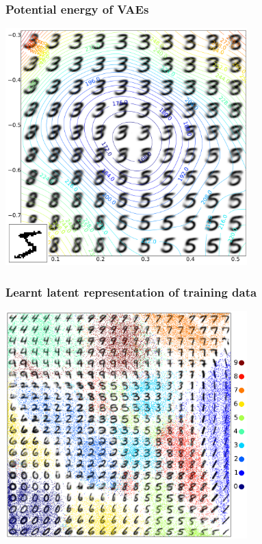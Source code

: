 \documentclass{beamer}
\begin{document}
\begin{frame}[noframenumbering]
	\frametitle{Potential energy of VAEs}
	\centering
	\includegraphics[width=0.7\textwidth]{figures/vae_pot_energy_example_with_inset.pdf}
\end{frame}

\begin{frame}[noframenumbering]
	\frametitle{Learnt latent representation of training data}
	\centering
	\includegraphics[width=0.7\textwidth]{figures/learned_representation_train_points_small.pdf}
\end{frame}
\end{document}
